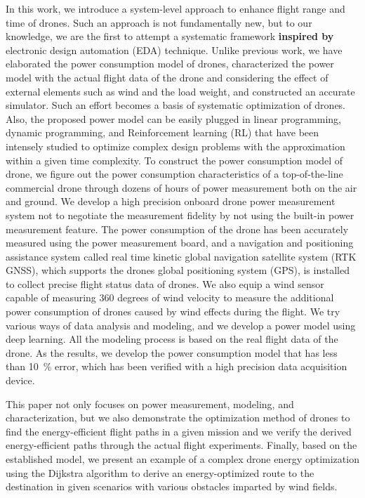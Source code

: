 \documentclass[journal]{./template/IEEEtran}
\begin{document}
In this work, we introduce a system-level approach to enhance flight range and time of drones.
Such an approach is not fundamentally new, but to our knowledge, we are the first to attempt a systematic framework \textbf{inspired by} electronic design automation (EDA) technique.
Unlike previous work, we have elaborated the power consumption model of drones, characterized the power model with the actual flight data of the drone and considering the effect of external elements such as wind and the load weight, and constructed an accurate simulator.
Such an effort becomes a basis of systematic optimization of drones.
Also, the proposed power model can be easily plugged in linear programming, dynamic programming, and Reinforcement learning (RL) that have been intensely studied to optimize complex design problems with the approximation within a given time complexity.
To construct the power consumption model of drone, we figure out the power consumption characteristics of a top-of-the-line commercial drone through dozens of hours of power measurement both on the air and ground.
We develop a high precision onboard drone power measurement system not to negotiate the measurement fidelity by not using the built-in power measurement feature. 
The power consumption of the drone has been accurately measured using the power measurement board, and a navigation and positioning assistance system called real time kinetic global navigation satellite system (RTK GNSS), which supports the drones global positioning system (GPS), is installed to collect precise flight status data of drones.
We also equip a wind sensor capable of measuring 360 degrees of wind velocity to measure the additional power consumption of drones caused by wind effects during the flight.
We try various ways of data analysis and modeling, and we develop a power model using deep learning.
All the modeling process is based on the real flight data of the drone. 
As the results, we develop the power consumption model that has less than 10~\% error, which has been verified with a high precision data acquisition device.

This paper not only focuses on power measurement, modeling, and characterization, but we also demonstrate the optimization method of drones to find the energy-efficient flight paths in a given mission and we verify the derived energy-efficient paths through the actual flight experiments.
Finally, based on the established model, we present an example of a complex drone energy optimization using the Dijkstra algorithm to derive an energy-optimized route to the destination in given scenarios with various obstacles imparted by wind fields.
\end{document}
